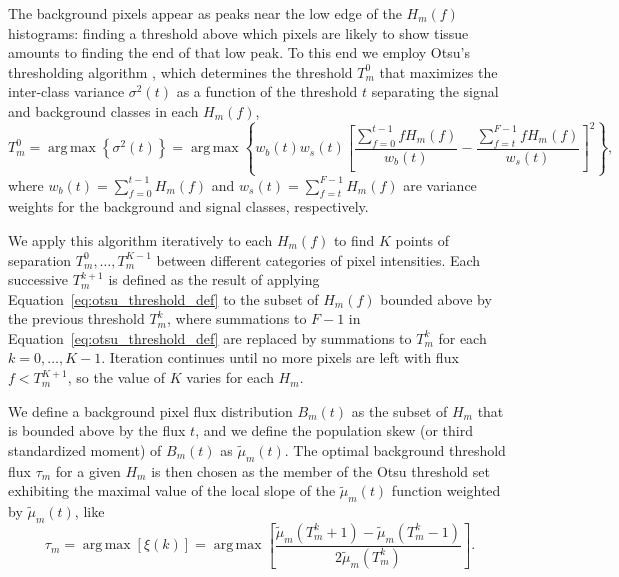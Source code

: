 \documentclass[letterpaper,11pt]{article}
\newcommand{\refeq}[1]{Equation~\ref{#1}}
\DeclareMathOperator*{\argmax}{arg\,max}
\begin{document}
The background pixels appear as peaks near the low edge of the $H_{m}(f)$ histograms: finding a threshold above which pixels are likely to show tissue amounts to finding the end of that low peak. To this end we employ Otsu's thresholding algorithm \cite{4310076}, which determines the threshold $T^{0}_{m}$ that maximizes the inter-class variance $\sigma^2(t)$ as a function of the threshold $t$ separating the signal and background classes in each $H_{m}(f)$,
\begin{equation}
T^{0}_{m} = \argmax{ \left\{ \sigma^2(t) \right\} } = \argmax{ \left\{ w_{b}(t) w_{s}(t) \left[ \frac{\sum_{f=0}^{t-1} f H_{m}(f)}{w_{b}(t)} - \frac{\sum_{f=t}^{F-1} f H_{m}(f)}{w_{s}(t)} \right]^2 \right\} },
\label{eq:otsu_threshold_def}
\end{equation}  
where $w_{b}(t) = \sum_{f=0}^{t-1} H_{m}(f)$ and $w_{s}(t) = \sum_{f=t}^{F-1} H_{m}(f)$ are variance weights for the background and signal classes, respectively.

We apply this algorithm iteratively to each $H_{m}(f)$ to find $K$ points of separation $T^{0}_{m}, \ldots, T^{K-1}_{m}$ between different categories of pixel intensities. Each successive $T^{k+1}_{m}$ is defined as the result of applying \refeq{eq:otsu_threshold_def} to the subset of $H_{m}(f)$ bounded above by the previous threshold $T^{k}_{m}$, where summations to $F-1$ in \refeq{eq:otsu_threshold_def} are replaced by summations to $T^{k}_{m}$ for each $k=0,\ldots,K-1$. Iteration continues until no more pixels are left with flux $f<T^{K+1}_{m}$, so the value of $K$ varies for each $H_{m}$.

We define a background pixel flux distribution $B_{m}(t)$ as the subset of $H_{m}$ that is bounded above by the flux $t$, and we define the population skew (or third standardized moment) of $B_{m}(t)$ as $\widetilde{\mu}_{m}(t)$. The optimal background threshold flux $\tau_{m}$ for a given $H_{m}$ is then chosen as the member of the Otsu threshold set exhibiting the maximal value of the local slope of the $\widetilde{\mu}_{m}(t)$ function weighted by $\widetilde{\mu}_{m}(t)$, like
\begin{equation}
\tau_{m} = \argmax{\left[ \xi(k) \right]} = \argmax{ \left[ \frac{ \widetilde{\mu}_{m}(T^{k}_{m}+1) - \widetilde{\mu}_{m}(T^{k}_{m}-1) }{ 2 \widetilde{\mu}_{m}(T^{k}_{m}) } \right] } .
\label{eq:otsu_choice_def}
\end{equation}
\end{document}
